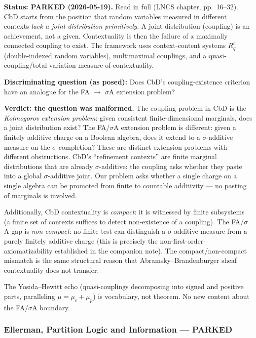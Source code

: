 \medskip\noindent
\textbf{Status: PARKED (2026-05-19).}  Read in full (LNCS chapter,
pp.~16--32).  CbD starts from the position that random variables
measured in different contexts \emph{lack a joint distribution
primitively}.  A joint distribution (coupling) is an achievement,
not a given.  Contextuality is then the failure of a maximally
connected coupling to exist.  The framework uses context-content
systems $R_q^c$ (double-indexed random variables), multimaximal
couplings, and a quasi-coupling/total-variation measure of contextuality.

\medskip\noindent\textbf{Discriminating question (as posed):} Does
CbD's coupling-existence criterion have an analogue for the FA $\to$
$\sigma$A extension problem?

\medskip\noindent
\textbf{Verdict: the question was malformed.}  The coupling problem
in CbD is the \emph{Kolmogorov extension problem}: given consistent
finite-dimensional marginals, does a joint distribution exist?  The
FA/$\sigma$A extension problem is different: given a finitely additive
charge on a Boolean algebra, does it extend to a $\sigma$-additive
measure on the $\sigma$-completion?  These are distinct extension
problems with different obstructions.  CbD's ``refinement contexts''
are finite marginal distributions that are already $\sigma$-additive;
the coupling asks whether they paste into a global $\sigma$-additive
joint.  Our problem asks whether a single charge on a single algebra
can be promoted from finite to countable additivity --- no pasting
of marginals is involved.

Additionally, CbD contextuality is \emph{compact}: it is witnessed
by finite subsystems (a finite set of contexts suffices to detect
non-existence of a coupling).  The FA/$\sigma$A gap is
\emph{non-compact}: no finite test can distinguish a $\sigma$-additive
measure from a purely finitely additive charge (this is precisely the
non-first-order-axiomatizability established in the companion note).
The compact/non-compact mismatch is the same structural reason that
Abramsky--Brandenburger sheaf contextuality does not transfer.

The Yosida--Hewitt echo (quasi-couplings decomposing into signed and
positive parts, paralleling $\mu = \mu_c + \mu_p$) is vocabulary,
not theorem.  No new content about the FA/$\sigma$A boundary.

\subsubsection*{Ellerman, Partition Logic and Information --- PARKED}


